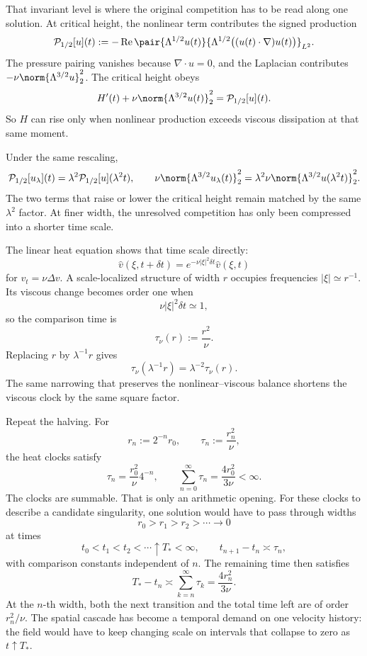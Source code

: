 
That invariant level is where the original competition has to be read along one solution. At critical height, the nonlinear term contributes the signed production
\[
  \mathcal P_{1/2}[u](t)
  :=
  -\operatorname{Re}
  \pair
    {\Lambda^{1/2}u(t)}
    {\Lambda^{1/2}\bigl((u(t)\cdot\nabla)u(t)\bigr)}_{L^2}.
\]
The pressure pairing vanishes because \(\nabla\cdot u=0\), and the Laplacian contributes \(-\nu\norm{\Lambda^{3/2}u}_2^2\). The critical height obeys
\[
  H'(t)
  +
  \nu\norm{\Lambda^{3/2}u(t)}_2^2
  =
  \mathcal P_{1/2}[u](t).
\]
So \(H\) can rise only when nonlinear production exceeds viscous dissipation at that same moment.

Under the same rescaling,
\[
  \mathcal P_{1/2}[u_\lambda](t)
  =
  \lambda^2\mathcal P_{1/2}[u](\lambda^2t),
  \qquad
  \nu\norm{\Lambda^{3/2}u_\lambda(t)}_2^2
  =
  \lambda^2\nu\norm{\Lambda^{3/2}u(\lambda^2t)}_2^2.
\]
The two terms that raise or lower the critical height remain matched by the same \(\lambda^2\) factor. At finer width, the unresolved competition has only been compressed into a shorter time scale.


The linear heat equation shows that time scale directly:
\[
  \widehat v(\xi,t+\delta t)
  =
  e^{-\nu|\xi|^2\delta t}\widehat v(\xi,t)
\]
for \(v_t=\nu\Delta v\). A scale-localized structure of width \(r\) occupies frequencies \(|\xi|\simeq r^{-1}\). Its viscous change becomes order one when
\[
  \nu|\xi|^2\delta t\simeq1,
\]
so the comparison time is
\[
  \tau_\nu(r)
  :=
  \frac{r^2}{\nu}.
\]
Replacing \(r\) by \(\lambda^{-1}r\) gives
\[
  \tau_\nu(\lambda^{-1}r)
  =
  \lambda^{-2}\tau_\nu(r).
\]
The same narrowing that preserves the nonlinear--viscous balance shortens the viscous clock by the same square factor.


Repeat the halving. For
\[
  r_n:=2^{-n}r_0,
  \qquad
  \tau_n:=\frac{r_n^2}{\nu},
\]
the heat clocks satisfy
\[
  \tau_n
  =
  \frac{r_0^2}{\nu}4^{-n},
  \qquad
  \sum_{n=0}^{\infty}\tau_n
  =
  \frac{4r_0^2}{3\nu}
  <
  \infty.
\]
The clocks are summable. That is only an arithmetic opening. For these clocks to describe a candidate singularity, one \NavierStokes{} solution would have to pass through widths
\[
  r_0>r_1>r_2>\cdots\longrightarrow0
\]
at times
\[
  t_0<t_1<t_2<\cdots\uparrow T_*<\infty,
  \qquad
  t_{n+1}-t_n\asymp\tau_n,
\]
with comparison constants independent of \(n\). The remaining time then satisfies
\[
  T_*-t_n
  \asymp
  \sum_{k=n}^{\infty}\tau_k
  =
  \frac{4r_n^2}{3\nu}.
\]
At the \(n\)-th width, both the next transition and the total time left are of order \(r_n^2/\nu\). The spatial cascade has become a temporal demand on one velocity history: the field would have to keep changing scale on intervals that collapse to zero as \(t\uparrow T_*\).